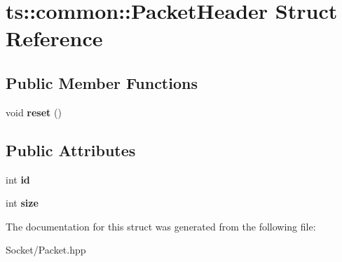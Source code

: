 \hypertarget{structts_1_1common_1_1_packet_header}{}\section{ts\+:\+:common\+:\+:Packet\+Header Struct Reference}
\label{structts_1_1common_1_1_packet_header}
\subsection*{Public Member Functions}
\begin{DoxyCompactItemize}
\item 
\mbox{\label{structts_1_1common_1_1_packet_header_adf4e5e691171eeac8d38f8d0ddf3e138}} 
void {\bfseries reset} ()
\end{DoxyCompactItemize}
\subsection*{Public Attributes}
\begin{DoxyCompactItemize}
\item 
\mbox{\label{structts_1_1common_1_1_packet_header_a95214ffcb1c52edd7a6282c2e6a40025}} 
int {\bfseries id}
\item 
\mbox{\label{structts_1_1common_1_1_packet_header_a5dc7af4be3fbff0ca3756202450fe882}} 
int {\bfseries size}
\end{DoxyCompactItemize}


The documentation for this struct was generated from the following file\+:\begin{DoxyCompactItemize}
\item 
Socket/Packet.\+hpp\end{DoxyCompactItemize}
